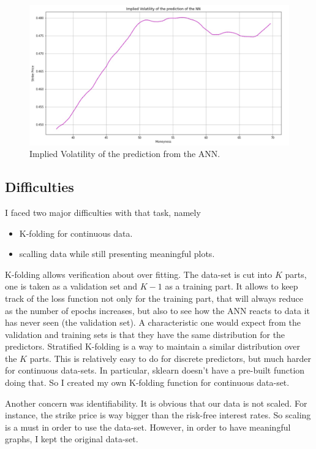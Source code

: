 \begin{figure}
\centering
\includegraphics[width = 0.7 \textwidth]{../addition_part/images/NN/IV_NN.jpg}
\caption{Implied Volatility of the prediction from the ANN.}
\label{fig:iv_nn}
\end{figure}




\subsection{Difficulties}


I faced two major difficulties with that task, namely


\begin{itemize}
  \item K-folding for continuous data.
  \item scalling data while still presenting meaningful plots.
\end{itemize}


K-folding allows verification about over fitting. The data-set is cut into $K$ parts, one is taken as a validation set and $K-1$ as a training part. It allows to keep track of the loss function not only for the training part, that will always reduce as the number of epochs increases, but also to see how the ANN reacts to data it has never seen (the validation set). A characteristic one would expect from the validation and training sets is that they have the same distribution for the predictors. Stratified K-folding is a way to maintain a similar distribution over the $K$ parts. This is relatively easy to do for discrete predictors, but much harder for continuous data-sets. In particular, sklearn doesn't have a pre-built function doing that. So I created my own K-folding function for continuous data-set.

Another concern was identifiability. It is obvious that our data is not scaled. For instance, the strike price is way bigger than the risk-free interest rates. So scaling is a must in order to use the data-set. However, in order to have meaningful graphs, I kept the original data-set.

